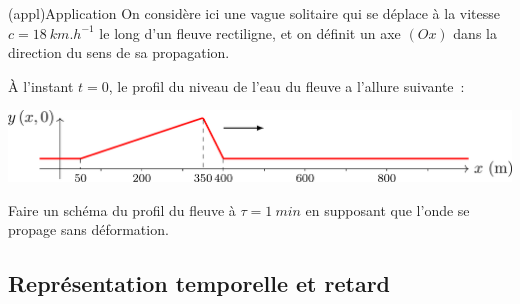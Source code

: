 \documentclass[../../main/main.tex]{subfiles}
\begin{document}
\begin{tcb}(appl){Application}
	On considère ici une vague solitaire qui se déplace à la vitesse $\boxed{c =
			\SI{18}{km.h^{-1}}}$ le long d'un fleuve rectiligne, et on définit un axe
	$(Ox)$ dans la direction du sens de sa propagation.

	À l'instant $t=0$, le profil du niveau de l'eau du fleuve a l'allure
	suivante~:
	\begin{center}
		\includegraphics[width=0.8\linewidth]{rep_spa-masc_a}
	\end{center}
	Faire un schéma du profil du fleuve à $\tau = \SI{1}{min}$ en supposant que
	l'onde se propage sans déformation.
	\tcblower
	\begin{center}
	\end{center}
\end{tcb}

\subsection{Représentation temporelle et retard}
\end{document}
